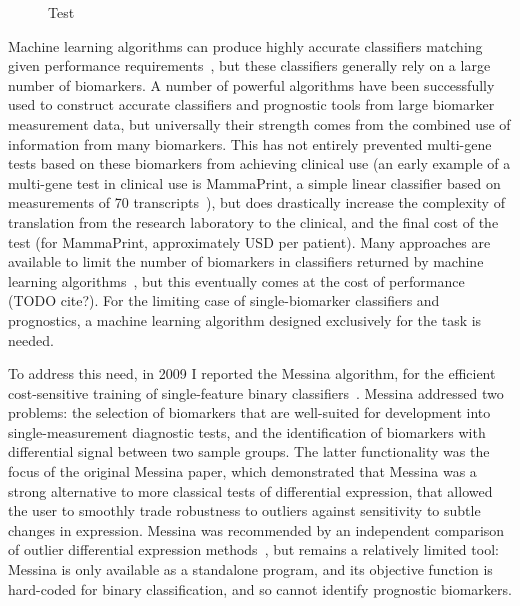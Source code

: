 \documentclass[dissertation.tex]{subfiles}
\begin{document}
\begin{figure}[!htbp]
\caption{Test}
\label{fig:messina-example-stats-class}
\end{figure}

Machine learning algorithms can produce highly accurate classifiers matching given performance requirements~\cite{Bach2006}, but these classifiers generally rely on a large number of biomarkers.  A number of powerful algorithms have been successfully used to construct accurate classifiers and prognostic tools from large biomarker measurement data, but universally their strength comes from the combined use of information from many biomarkers.  This has not entirely prevented multi-gene tests based on these biomarkers from achieving clinical use (an early example of a multi-gene test in clinical use is MammaPrint\texttrademark, a simple linear classifier based on measurements of 70 transcripts~\cite{Veer2002}), but does drastically increase the complexity of translation from the research laboratory to the clinical, and the final cost of the test (for MammaPrint, approximately  USD per patient).  Many approaches are available to limit the number of biomarkers in classifiers returned by machine learning algorithms~\cite{Guyon2003}, but this eventually comes at the cost of performance (TODO cite?).  For the limiting case of single-biomarker classifiers and prognostics, a machine learning algorithm designed exclusively for the task is needed.

To address this need, in 2009 I reported the Messina algorithm, for the efficient cost-sensitive training of single-feature binary classifiers~\cite{Pinese2009}.  Messina addressed two problems: the selection of biomarkers that are well-suited for development into single-measurement diagnostic tests, and the identification of biomarkers with differential signal between two sample groups.  The latter functionality was the focus of the original Messina paper, which demonstrated that Messina was a strong alternative to more classical tests of differential expression, that allowed the user to smoothly trade robustness to outliers against sensitivity to subtle changes in expression.  Messina was recommended by an independent comparison of outlier differential expression methods~\cite{Karrila2011}, but remains a relatively limited tool: Messina is only available as a standalone program, and its objective function is hard-coded for binary classification, and so cannot identify prognostic biomarkers.
\end{document}
